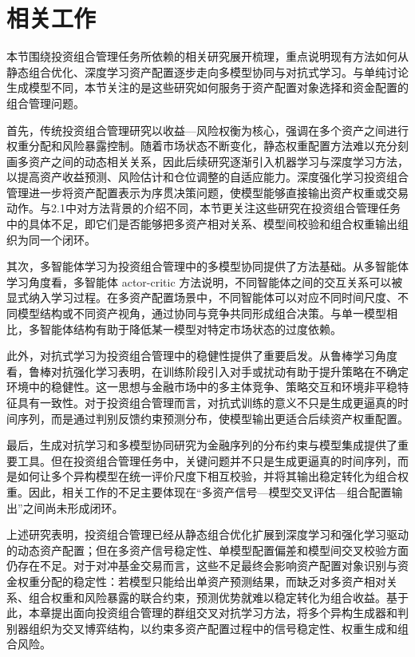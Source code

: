 \section{相关工作}

本节围绕投资组合管理任务所依赖的相关研究展开梳理，重点说明现有方法如何从静态组合优化、深度学习资产配置逐步走向多模型协同与对抗式学习。与单纯讨论生成模型不同，本节关注的是这些研究如何服务于资产配置对象选择和资金配置的组合管理问题。

首先，传统投资组合管理研究以收益—风险权衡为核心，强调在多个资产之间进行权重分配和风险暴露控制。随着市场状态不断变化，静态权重配置方法难以充分刻画多资产之间的动态相关关系，因此后续研究逐渐引入机器学习与深度学习方法，以提高资产收益预测、风险估计和仓位调整的自适应能力。深度强化学习投资组合管理进一步将资产配置表示为序贯决策问题，使模型能够直接输出资产权重或交易动作。与2.1中对方法背景的介绍不同，本节更关注这些研究在投资组合管理任务中的具体不足，即它们是否能够把多资产相对关系、模型间校验和组合权重输出组织为同一个闭环。

其次，多智能体学习为投资组合管理中的多模型协同提供了方法基础。从多智能体学习角度看，多智能体 actor-critic 方法说明，不同智能体之间的交互关系可以被显式纳入学习过程\cite{lowe2017multi}。在多资产配置场景中，不同智能体可以对应不同时间尺度、不同模型结构或不同资产视角，通过协同与竞争共同形成组合决策。与单一模型相比，多智能体结构有助于降低某一模型对特定市场状态的过度依赖。

此外，对抗式学习为投资组合管理中的稳健性提供了重要启发。从鲁棒学习角度看，鲁棒对抗强化学习表明，在训练阶段引入对手或扰动有助于提升策略在不确定环境中的稳健性\cite{pinto2017robust}。这一思想与金融市场中的多主体竞争、策略交互和环境非平稳特征具有一致性。对于投资组合管理而言，对抗式训练的意义不只是生成更逼真的时间序列，而是通过判别反馈约束预测分布，使模型输出更适合后续资产权重配置。

最后，生成对抗学习和多模型协同研究为金融序列的分布约束与模型集成提供了重要工具。但在投资组合管理任务中，关键问题并不只是生成更逼真的时间序列，而是如何让多个异构模型在统一评价尺度下相互校验，并将其输出稳定转化为组合权重。因此，相关工作的不足主要体现在“多资产信号—模型交叉评估—组合配置输出”之间尚未形成闭环。

上述研究表明，投资组合管理已经从静态组合优化扩展到深度学习和强化学习驱动的动态资产配置；但在多资产信号稳定性、单模型配置偏差和模型间交叉校验方面仍存在不足。对于对冲基金交易而言，这些不足最终会影响资产配置对象识别与资金权重分配的稳定性：若模型只能给出单资产预测结果，而缺乏对多资产相对关系、组合权重和风险暴露的联合约束，预测优势就难以稳定转化为组合收益。基于此，本章提出面向投资组合管理的群组交叉对抗学习方法，将多个异构生成器和判别器组织为交叉博弈结构，以约束多资产配置过程中的信号稳定性、权重生成和组合风险。


